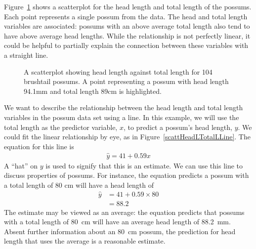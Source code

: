 Figure~\ref{scattHeadLTotalL} shows a scatterplot for the head
length and total length of the possums.
Each point represents a single possum from the data.
The head and total length variables are associated:
possums with an above average total length also tend to have
above average head lengths.
While the relationship is not perfectly linear, it could
be helpful to partially explain the connection between these
variables with a straight line.


\begin{figure}[h]
  \centering
  \caption{A scatterplot showing head length against total length
      for 104 brushtail possums.
      A point representing a possum with head length 94.1mm
      and total length 89cm is highlighted.}
  \label{scattHeadLTotalL}
\end{figure}



We want to describe the relationship between the head length and total length variables in the possum data set using a line. In this example, we will use the total length as the predictor variable, $x$, to predict a possum's head length, $y$. We could fit the linear relationship by eye, as in Figure~\ref{scattHeadLTotalLLine}. The equation for this line is
\begin{align*}
\hat{y} = 41 + 0.59x
\end{align*}
A ``hat'' on $y$ is used to signify that this is an estimate.
We can use this line to discuss properties of possums.
For instance, the equation predicts a possum with a total length
of 80 cm will have a head length of
\begin{align*}
\hat{y} &= 41 + 0.59\times 80 \\
	&= 88.2 %
\end{align*}
The estimate may be viewed as an average:
the equation predicts that possums with a total length of
80~cm will have an average head length of 88.2~mm.
Absent further information about an 80~cm possum,
the prediction for head length that uses the average
is a reasonable estimate.

